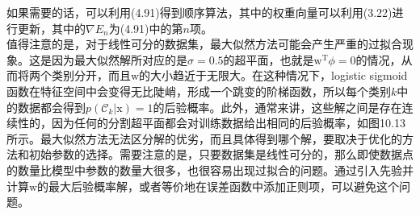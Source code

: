 \documentclass[b5paper]{book}
\numberwithin{equation}{chapter}
\newcommand {\bx} {\boldsymbol{\mathrm{x}}}
\newcommand {\bw} {\boldsymbol{\mathrm{w}}}
\newcommand {\rmT} {\mathrm{T}}
\newcommand {\calC} {\mathcal{C}}
\begin{document}
{	\indent 如果需要的话，可以利用(4.91)得到顺序算法，其中的权重向量可以利用(3.22)进行更新，其中的$\nabla E_n$为(4.91)中的第$n$项。\\
	\indent 值得注意的是，对于线性可分的数据集，最大似然方法可能会产生严重的过拟合现象。这是因为最大似然解所对应的是$\sigma = 0.5$的超平面，也就是$\bw^{\rmT}\phi=0$的情况，从而将两个类别分开，而且$\bw$的大小趋近于无限大。在这种情况下，logistic sigmoid函数在特征空间中会变得无比陡峭，形成一个跳变的阶梯函数，所以每个类别$k$中的数据都会得到$p(\calC_k|\bx)=1$的后验概率。此外，通常来讲，这些解之间是存在连续性的，因为任何的分割超平面都会对训练数据给出相同的后验概率，如图10.13所示。最大似然方法无法区分解的优劣，而且具体得到哪个解，要取决于优化的方法和初始参数的选择。需要注意的是，只要数据集是线性可分的，那么即使数据点的数量比模型中参数的数量大很多，也很容易出现过拟合的问题。通过引入先验并计算$\bw$的最大后验概率解，或者等价地在误差函数中添加正则项，可以避免这个问题。
	}
\end{document}
